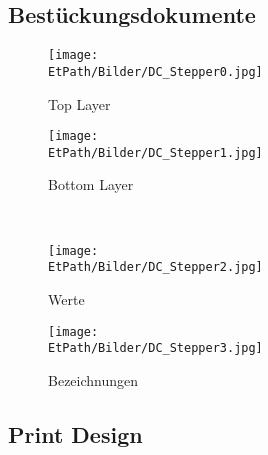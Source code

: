 	\subsection*{Bestückungsdokumente}
	\begin{figure}[h!]
		\centering
		\begin{minipage}[hbt]{6cm}
			\centering
			\texttt{[image: \\EtPath/Bilder/DC\_Stepper0.jpg]}
			\caption{Top Layer}
			\label{fig:Top Layer}
		\end{minipage}
		\hspace{1.5cm}
		\begin{minipage}[hbt]{6cm}
			\centering
			\texttt{[image: \\EtPath/Bilder/DC\_Stepper1.jpg]}
			\caption{Bottom Layer}
			\label{fig:Bottom Layer}
		\end{minipage}
		\\[4ex]
		\begin{minipage}[hbt]{6cm}
			\centering
			\texttt{[image: \\EtPath/Bilder/DC\_Stepper2.jpg]}
			\caption{Werte}
			\label{fig:Werte}
		\end{minipage}
		\hspace{1.5cm}
		\begin{minipage}[hbt]{6cm}
			\centering
			\texttt{[image: \\EtPath/Bilder/DC\_Stepper3.jpg]}
			\caption{Bezeichnungen}
			\label{fig:Bezeichnungen}
		\end{minipage}
	\end{figure}
	\ifSTANDALONE
	\subsection{Print Design} \label{sec:PrintDesign}	
	\fi
	\ifEMBED
